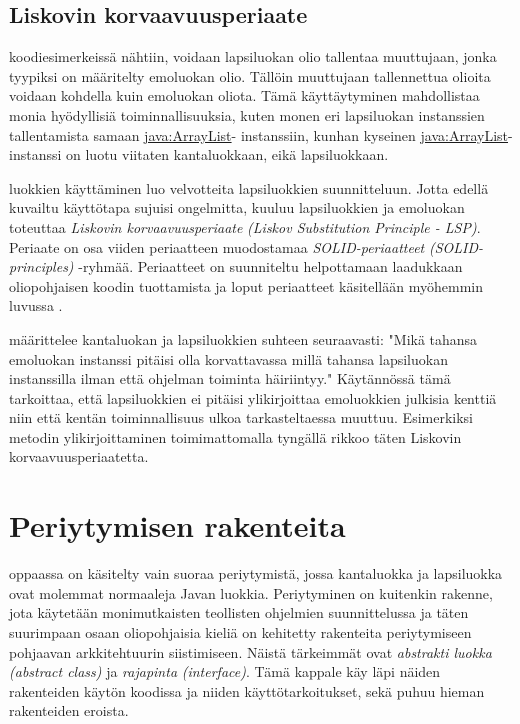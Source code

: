 \documentclass{tufte-book}
\newcommand{\eng}[1]{\textit{(#1)}}
\newcommand{\new}[1]{\textit{\gls{#1}}}
\newcommand{\neweng}[2]{\new{#1} \eng{#2}}
\newcommand{\java}[1]{\underline{\gls{java:#1}}}
\begin{document}
\subsection{Liskovin korvaavuusperiaate}
\label{LSP}

  koodiesimerkeissä nähtiin, voidaan lapsiluokan olio
tallentaa muuttujaan, jonka tyypiksi on määritelty emoluokan olio. Tällöin muuttujaan tallennettua
olioita voidaan kohdella kuin emoluokan oliota. Tämä käyttäytyminen mahdollistaa monia hyödyllisiä
toiminnallisuuksia, kuten monen eri lapsiluokan instanssien tallentamista samaan \java{ArrayList}-
instanssiin, kunhan kyseinen \java{ArrayList}-instanssi on luotu viitaten kantaluokkaan, eikä
lapsiluokkaan.

 luokkien käyttäminen luo velvotteita lapsiluokkien suunnitteluun.
Jotta edellä kuvailtu käyttötapa sujuisi ongelmitta, kuuluu lapsiluokkien ja emoluokan toteuttaa
\neweng{Liskovin korvaavuusperiaate}{Liskov Substitution Principle - LSP}. Periaate on osa
viiden periaatteen muodostamaa \neweng{SOLID-periaatteet}{SOLID-principles} -ryhmää. Periaatteet
on suunniteltu helpottamaan laadukkaan oliopohjaisen koodin tuottamista ja loput periaatteet
käsitellään myöhemmin luvussa .

 määrittelee kantaluokan ja lapsiluokkien suhteen
seuraavasti: "Mikä tahansa emoluokan instanssi pitäisi olla korvattavassa millä tahansa 
lapsiluokan instanssilla ilman että ohjelman toiminta häiriintyy." Käytännössä tämä tarkoittaa,
että lapsiluokkien ei pitäisi ylikirjoittaa emoluokkien julkisia kenttiä niin että kentän
toiminnallisuus ulkoa tarkasteltaessa muuttuu. Esimerkiksi metodin ylikirjoittaminen
toimimattomalla tyngällä rikkoo täten Liskovin korvaavuusperiaatetta.


\section{Periytymisen rakenteita}
\label{periytyminen5}

 oppaassa on käsitelty vain suoraa periytymistä, jossa
\gls{kantaluokka} ja \gls{lapsiluokka} ovat molemmat normaaleja Javan luokkia. Periytyminen on
kuitenkin rakenne, jota käytetään monimutkaisten teollisten ohjelmien suunnittelussa ja täten
suurimpaan osaan oliopohjaisia kieliä on kehitetty rakenteita periytymiseen pohjaavan
arkkitehtuurin siistimiseen. Näistä tärkeimmät ovat \neweng{abstrakti luokka}{abstract class} ja
\neweng{rajapinta}{interface}. Tämä kappale käy läpi näiden rakenteiden käytön koodissa ja niiden
käyttötarkoitukset, sekä puhuu hieman rakenteiden eroista.
\end{document}
